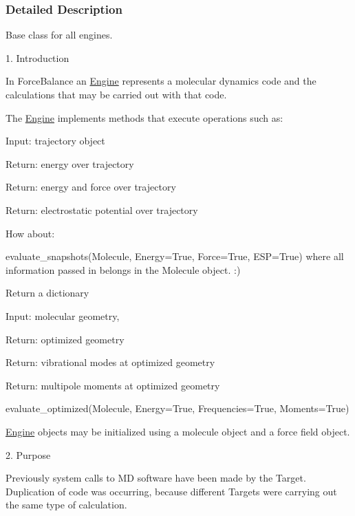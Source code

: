 \subsubsection{\-Detailed \-Description}
\-Base class for all engines. 

1. \-Introduction

\-In \-Force\-Balance an \hyperlink{classforcebalance_1_1engine_1_1Engine}{\-Engine} represents a molecular dynamics code and the calculations that may be carried out with that code.

\-The \hyperlink{classforcebalance_1_1engine_1_1Engine}{\-Engine} implements methods that execute operations such as\-:
\begin{DoxyItemize}
\item \-Input\-: trajectory object
\item \-Return\-: energy over trajectory
\item \-Return\-: energy and force over trajectory
\item \-Return\-: electrostatic potential over trajectory
\item \-How about\-:
\item evaluate\-\_\-snapshots(\-Molecule, \-Energy=\-True, \-Force=\-True, \-E\-S\-P=\-True) where all information passed in belongs in the \-Molecule object. \-:)
\item \-Return a dictionary
\end{DoxyItemize}


\begin{DoxyItemize}
\item \-Input\-: molecular geometry,
\item \-Return\-: optimized geometry
\item \-Return\-: vibrational modes at optimized geometry
\item \-Return\-: multipole moments at optimized geometry
\item evaluate\-\_\-optimized(\-Molecule, \-Energy=\-True, \-Frequencies=\-True, \-Moments=\-True)
\end{DoxyItemize}


\begin{DoxyItemize}
\item \hyperlink{classforcebalance_1_1engine_1_1Engine}{\-Engine} objects may be initialized using a molecule object and a force field object.
\end{DoxyItemize}

2. \-Purpose

\-Previously system calls to \-M\-D software have been made by the \-Target. \-Duplication of code was occurring, because different \-Targets were carrying out the same type of calculation.

